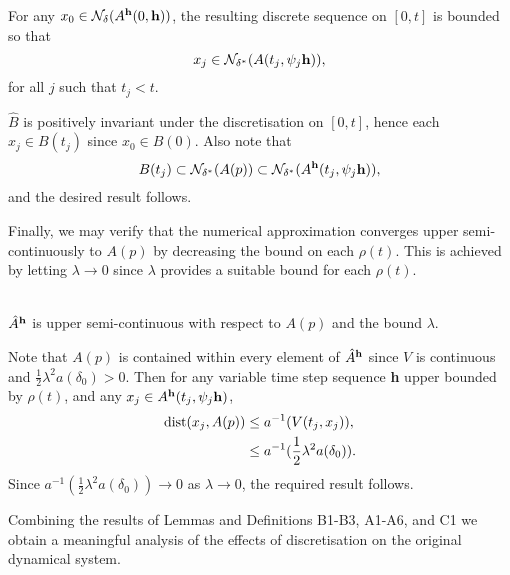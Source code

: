 \begin{lemma}
For any $x_0 \in \mathcal{N}_{\delta}(A^{{\bf h}}(0, {\bf h}))$, the resulting
discrete sequence on $[0, t]$ is bounded so that
\[ x_j \in \mathcal{N}_{\delta^*}(A(t_j, \psi_j{\bf h})), \]
for all $j$ such that $t_j < t$.
\end{lemma}
\begin{prf}
$\hat{B}$ is positively invariant under the discretisation on $[0, t]$, hence
each $x_j \in B(t_j)$ since $x_0 \in B(0)$. Also note that
\[ B(t_j) \subset \mathcal{N}_{\delta^*}(A(p)) \subset
   \mathcal{N}_{\delta^*}(A^{{\bf h}}(t_j, \psi_j{\bf h})), \]
and the desired result follows.
\end{prf}

Finally, we may verify that the numerical approximation converges upper
semi-continuously to $A(p)$ by decreasing the bound on each $\rho(t)$. This is
achieved by letting $\lambda \to 0$ since $\lambda$ provides a suitable bound
for each $\rho(t)$.

\begin{lemma} \hfill \\
$\hat{A}^{{\bf h}}$ is upper semi-continuous with respect to $A(p)$ and the
bound $\lambda$.
\end{lemma}
\begin{prf}
Note that $A(p)$ is contained within every element of $\hat{A}^{{\bf h}}$ since
$V$ is continuous and $\frac{1}{2} \lambda^2 a(\delta_0) > 0$. Then for any
variable time step sequence {\bf h} upper bounded by $\rho(t)$, and any $x_j
\in A^{{\bf h}}(t_j, \psi_j{\bf h})$,
\begin{align*}
  {\rm dist}( x_j, A(p) ) &\leq a^{-1} (V(t_j, x_j)), \\
    &\leq a^{-1}(\frac{1}{2}\lambda^2 a(\delta_0)). \\
\end{align*}
Since $a^{-1}(\frac{1}{2}\lambda^2 a(\delta_0)) \to 0$ as $\lambda \to 0$, the
required result follows.
\end{prf}

Combining the results of Lemmas and Definitions B1-B3, A1-A6, and C1 we obtain a
meaningful analysis of the effects of discretisation on the original dynamical
system.

